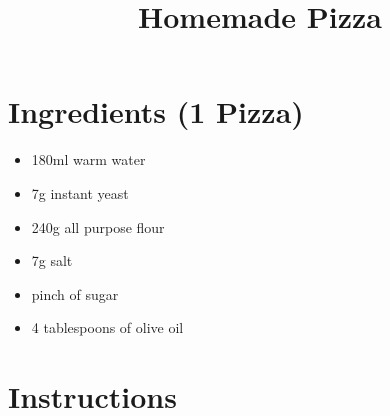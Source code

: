 \documentclass{article}
\title{Homemade Pizza}
\author{}
\date{}
\begin{document}
\maketitle


\section{Ingredients (1 Pizza)}

\begin{itemize}
    \item 180ml warm water
    \item 7g instant yeast
    \item 240g all purpose flour
    \item 7g salt
    \item pinch of sugar
    \item 4 tablespoons of olive oil
\end{itemize}

\section{Instructions}
\end{document}
